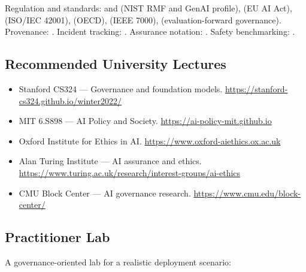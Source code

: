 Regulation and standards: \citet{nist2023airmf} and
\citet{nist2024genai_profile} (NIST RMF and GenAI profile),
\citet{eu_aiact_2024} (EU AI Act), \citet{iso42001_2023} (ISO/IEC
42001), \citet{oecd_ai_principles} (OECD), \citet{ieee_7000}
(IEEE 7000), \citet{uk_aisi_2024, singapore_aiverify_2024}
(evaluation-forward governance). Provenance:
\citet{c2pa}. Incident tracking: \citet{aiid}. Assurance
notation: \citet{gsn2021}. Safety benchmarking:
\citet{mlcommons_ailuminate}.

\subsection{Recommended University Lectures}

\begin{itemize}
  \item Stanford CS324 --- Governance and foundation models.
        \url{https://stanford-cs324.github.io/winter2022/}
  \item MIT 6.S898 --- AI Policy and Society.
        \url{https://ai-policy-mit.github.io}
  \item Oxford Institute for Ethics in AI.
        \url{https://www.oxford-aiethics.ox.ac.uk}
  \item Alan Turing Institute --- AI assurance and ethics.
        \url{https://www.turing.ac.uk/research/interest-groups/ai-ethics}
  \item CMU Block Center --- AI governance research.
        \url{https://www.cmu.edu/block-center/}
\end{itemize}

\subsection{Practitioner Lab}

A governance-oriented lab for a realistic deployment scenario:

